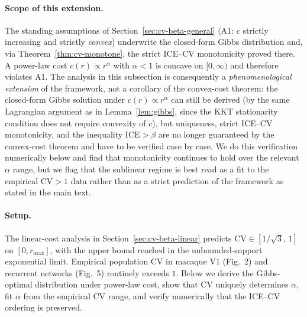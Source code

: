 \documentclass[11pt]{article}
\theoremstyle{remark}
\theoremstyle{definition}
\begin{document}
\paragraph{Scope of this extension.}
The standing assumptions of Section~\ref{sec:cv-beta-general} (A1: $c$ strictly increasing and strictly \emph{convex}) underwrite the closed-form Gibbs distribution and, via Theorem~\ref{thm:cv-monotone}, the strict ICE--CV monotonicity proved there.  A power-law cost $c(r)\propto r^\alpha$ with $\alpha<1$ is concave on $[0,\infty)$ and therefore violates A1.  The analysis in this subsection is consequently a \emph{phenomenological extension} of the framework, not a corollary of the convex-cost theorem: the closed-form Gibbs solution under $c(r)\propto r^\alpha$ can still be derived (by the same Lagrangian argument as in Lemma~\ref{lem:gibbs}, since the KKT stationarity condition does not require convexity of $c$), but uniqueness, strict ICE--CV monotonicity, and the inequality $\mathrm{ICE}>\beta$ are no longer guaranteed by the convex-cost theorem and have to be verified case by case.  We do this verification numerically below and find that monotonicity continues to hold over the relevant $\alpha$ range, but we flag that the sublinear regime is best read as a fit to the empirical CV$>1$ data rather than as a strict prediction of the framework as stated in the main text.

\paragraph{Setup.}
The linear-cost analysis in Section~\ref{sec:cv-beta-linear} predicts $\mathrm{CV}\in[1/\sqrt{3},\,1]$ on $[0,r_{\max}]$, with the upper bound reached in the unbounded-support exponential limit.  Empirical population CV in macaque V1 (Fig.~2) and recurrent networks (Fig.~5) routinely exceeds $1$.  Below we derive the Gibbs-optimal distribution under power-law cost, show that CV uniquely determines $\alpha$, fit $\alpha$ from the empirical CV range, and verify numerically that the ICE--CV ordering is preserved.
\end{document}
